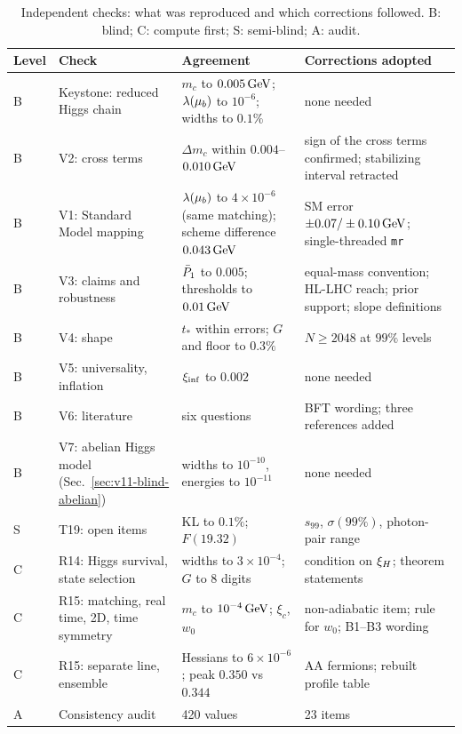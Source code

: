 \begin{table}[t]
\centering
\small
\caption{Independent checks: what was reproduced and which corrections followed. B: blind; C: compute first; S: semi-blind; A: audit.}
\label{tab:v19-summary}
\begin{tabular}{@{}p{}p{}p{}p{}@{}}
\toprule
Level & Check & Agreement & Corrections adopted \\
\midrule
B & Keystone: reduced Higgs chain & $m_c$ to $0.005\,\mathrm{GeV}$; $\lambda(\mu_b)$ to $10^{-6}$; widths to $0.1\%$ & none needed \\
B & V2: cross terms & $\Delta m_c$ within $0.004$--$0.010\,\mathrm{GeV}$ & sign of the cross terms confirmed; stabilizing interval retracted \\
B & V1: Standard Model mapping & $\lambda(\mu_b)$ to $4\times10^{-6}$ (same matching); scheme difference $0.043\,\mathrm{GeV}$ & SM error $\pm0.07/\pm0.10\,\mathrm{GeV}$; single-threaded \texttt{mr} \\
B & V3: claims and robustness & $\bar P_1$ to $0.005$; thresholds to $0.01\,\mathrm{GeV}$ & equal-mass convention; HL-LHC reach; prior support; slope definitions \\
B & V4: shape & $t_*$ within errors; $G$ and floor to $0.3\%$ & $N\ge2048$ at $99\%$ levels \\
B & V5: universality, inflation & $\xi_{\rm inf}$ to $0.002$ & none needed \\
B & V6: literature & six questions & BFT wording; three references added \\
B & V7: abelian Higgs model (Sec.~\ref{sec:v11-blind-abelian}) & widths to $10^{-10}$, energies to $10^{-11}$ & none needed \\
S & T19: open items & KL to $0.1\%$; $F(19.32)$ & $s_{99}$, $\sigma(99\%)$, photon-pair range \\
C & R14: Higgs survival, state selection & widths to $3\times10^{-4}$; $G$ to 8 digits & condition on $\xi_H$; theorem statements \\
C & R15: matching, real time, 2D, time symmetry & $m_c$ to $10^{-4}\,\mathrm{GeV}$; $\xi_c$, $w_0$ & non-adiabatic item; rule for $w_0$; B1--B3 wording \\
C & R15: separate line, ensemble & Hessians to $6\times10^{-6}$; peak $0.350$ vs $0.344$ & AA fermions; rebuilt profile table \\
A & Consistency audit & 420 values & 23 items \\
\bottomrule
\end{tabular}
\end{table}

